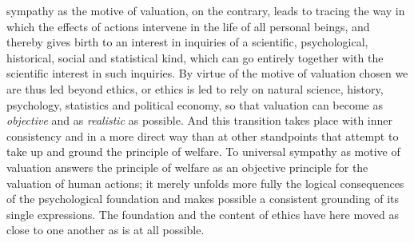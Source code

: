 \documentclass[12pt,a4paper,openany]{book}
\newcommand{\opage}[1]{\marginnote{\footnotesize\textit{[#1]}}}
\begin{document}
sympathy as the motive of valuation, on the contrary, leads to tracing the way in which the effects
of actions intervene in the life of all personal beings, and thereby gives birth to an interest in
inquiries of a scientific, psychological, historical, social and statistical kind, which can go
entirely together with the scientific interest in such inquiries. By virtue of the motive of valuation
chosen we are thus led beyond ethics, or ethics is led to rely on natural science, history,
psychology, statistics and political economy, so that valuation can become as \textit{objective} and as
\textit{realistic} as possible. And this transition takes place with inner consistency and in a more
direct way than at other standpoints that attempt to take up and ground the principle of welfare. To
universal sympathy as motive of valuation answers the principle of welfare as an objective principle
for the valuation of human actions; it merely unfolds more fully the logical consequences of the
\opage{59}psychological foundation and makes possible a consistent grounding of its single expressions. The
foundation and the content of ethics have here moved as close to one another as is at all possible.
\end{document}
